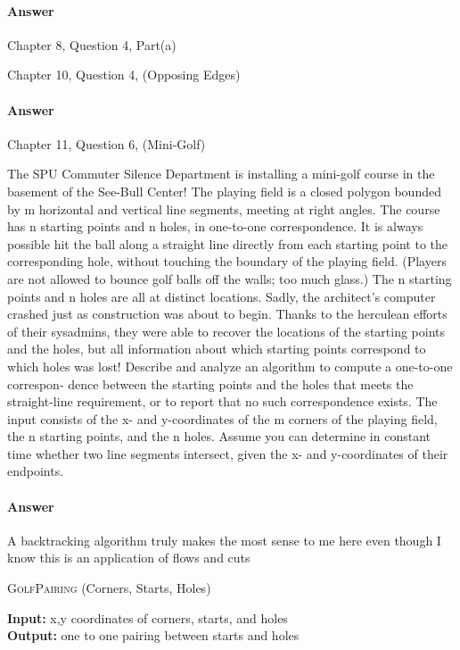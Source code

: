 \documentclass{article}
\begin{document}
\paragraph{Answer}



\collab{\todo{}}

Chapter 8, Question 4, Part(a)


\collab{\todo{}}
\nextprob{}

Chapter 10, Question 4, (Opposing Edges)

\paragraph{Answer}

\collab{\todo{}}
\nextprob{}

Chapter 11, Question 6, (Mini-Golf)

The SPU Commuter Silence Department is installing a mini-golf course in
the basement of the See-Bull Center! The playing field is a closed polygon
bounded by m horizontal and vertical line segments, meeting at right angles.
The course has n starting points and n holes, in one-to-one correspondence.
It is always possible hit the ball along a straight line directly from each
starting point to the corresponding hole, without touching the boundary
of the playing field. (Players are not allowed to bounce golf balls off the
walls; too much glass.) The n starting points and n holes are all at distinct
locations.
Sadly, the architect’s computer crashed just as construction was about to
begin. Thanks to the herculean efforts of their sysadmins, they were able to
recover the locations of the starting points and the holes, but all information
about which starting points correspond to which holes was lost!
Describe and analyze an algorithm to compute a one-to-one correspon-
dence between the starting points and the holes that meets the straight-line
requirement, or to report that no such correspondence exists. The input
consists of the x- and y-coordinates of the m corners of the playing field, the
n starting points, and the n holes. Assume you can determine in constant
time whether two line segments intersect, given the x- and y-coordinates
of their endpoints.

\paragraph{Answer}

A backtracking algorithm truly makes the most sense to me here even though I know this
is an application of flows and cuts

\begin{algorithm} \caption{\textsc{GolfPairing} (Corners, Starts, Holes)}\label{alg:seb}
    {\bf Input:} x,y coordinates of corners, starts, and holes\\
    {\bf Output:} one to one pairing between starts and holes
    \begin{algorithmic}[1]
        \State$$
    \end{algorithmic}
\end{algorithm}

\end{document}
